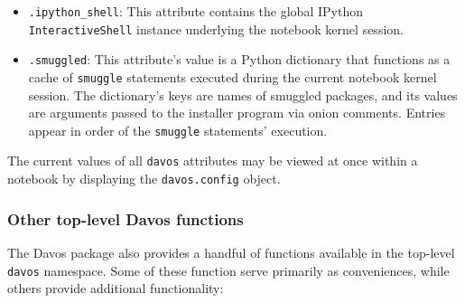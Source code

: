 \documentclass[preprint,12pt,a4paper]{elsarticle}
\begin{document}
\begin{itemize}

\item \texttt{.ipython\_shell}: This attribute contains the global IPython \texttt{InteractiveShell} instance underlying the notebook kernel session.

\item \texttt{.smuggled}: This attribute's value is a Python dictionary that functions as a cache of \texttt{smuggle} statements executed during the current notebook kernel session. The dictionary's keys are names of smuggled packages, and its values are arguments passed to the installer program via onion comments. Entries appear in order of the \texttt{smuggle} statements' execution.

\end{itemize}

The current values of all \texttt{davos} attributes may be viewed at once within a notebook by displaying the \texttt{davos.config} object.

\subsubsection{Other top-level Davos functions}\label{subsec:toplevel}

The Davos package also provides a handful of functions available in the top-level \texttt{davos} namespace. Some of these function serve primarily as conveniences, while others provide additional functionality:
\end{document}
